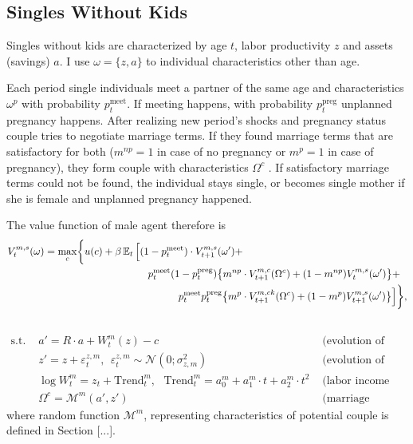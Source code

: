 \subsection{Singles Without Kids}
Singles without kids are characterized by age $t$, labor productivity $z$ and assets (savings) $a$. I use $\omega = \{z,a\}$ to individual characteristics other than age.

Each period single individuals meet a partner of the same age and characteristics $\omega^p$ with probability $p^{\text{meet}}_t$. If meeting happens, with probability $p^{\text{preg}}_t$ unplanned pregnancy happens. After realizing new period's shocks and pregnancy status couple tries to negotiate marriage terms. If they found marriage terms that are satisfactory for both ($m^{np} = 1$ in case of no pregnancy or $m^p = 1$ in case of pregnancy), they form couple with characteristics $\Omega^c$ . If satisfactory marriage terms could not be found, the individual stays single, or becomes single mother if she is female and unplanned pregnancy happened.

The value function of male agent therefore is
\begin{align}V^{m,s}_t(\omega) = \max\limits_{c} & \bigg\{ u(c) + \beta \E_t \Big[ (1 - p^{\text{meet}}_t)\cdot V^{m,s}_{t+1}(\omega') + \\ \nonumber
& \hspace{7em} p^{\text{meet}}_t (1-p^{\text{preg}}_t) \big\{ m^{np} \cdot V^{m,c}_{t+1}(\Omega^c) + (1-m^{np})V^{m,s}_t(\omega')\big\} + \\  \nonumber
& \hspace{10em} p^{\text{meet}}_t p^{\text{preg}}_t \big\{ m^{p} \cdot V^{m,ck}_{t+1}(\Omega^c) + (1-m^{p})V^{m,s}_{t+1}(\omega')\big\}  \Big]  \bigg\},\\  \nonumber
 \end{align}\vspace{-3em}
 \begin{align*}
 \text{s.t. \ }  &  a' = R\cdot a  + W^m_t(z) - c  & \text{ (evolution of assets)}\\
 &  z' = z + \varepsilon^{z,m}_t, \ \ \varepsilon^{z,m}_t \sim \mathcal{N}(0;\sigma_{z,m}^2) &  \text{ (evolution of productivity)}\\
  & \log W^m_t = z_t + \text{Trend}^m_t, \ \ \  \text{Trend}^m_t = a^m_0 + a^m_1\cdot t  +  a^m_2 \cdot t^2 &  \text{ (labor income and trend)}\\
  & \Omega^c = \mathcal{M}^m(a',z') &  \text{ (marriage prospectives)}
\end{align*}
where random function $\mathcal{M}^m$, representing characteristics of potential couple is defined in Section [...].


